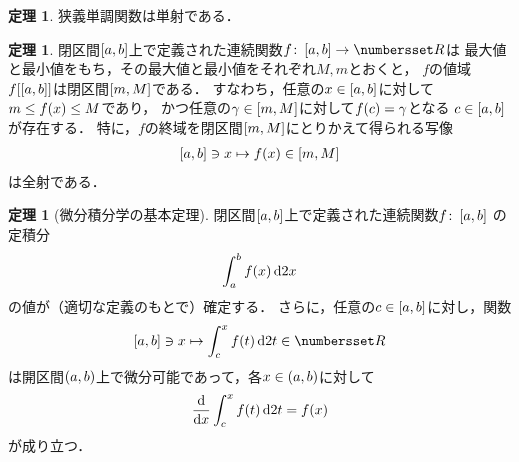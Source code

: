 \documentclass[11pt,a4paper]{ltjsarticle}
\newcommand*{\maparrow}{\rightarrow}
\newcommand*{\intd}{\dl2}
\newcommand*{\image}[2]{#1 \sqbracket*{#2}}
\theoremstyle{definition}
\newtheorem{thm}[dfn]{定理}
\begin{document}
\begin{thm} \label{thm:injection}
  狭義単調関数は単射である．
\end{thm}

\begin{thm} \label{thm:image}
  閉区間$\interval{c}{a,b}$上で定義された連続関数$f \colon \interval{c}{a,b} \maparrow \Real$は
  最大値と最小値をもち，その最大値と最小値をそれぞれ$M,m$とおくと，
  $f$の値域$\image{f}{\interval{c}{a,b}}$は閉区間$\interval{c}{m,M}$である．
  すなわち，任意の$x \in \interval{c}{a,b}$に対して$m \leq \apply{f}{x} \leq M$であり，
  かつ任意の$\gamma \in \interval{c}{m,M}$に対して$\apply{f}{c} = \gamma$となる
  $c \in \interval{c}{a,b}$が存在する．
  特に，$f$の終域を閉区間$\interval{c}{m,M}$にとりかえて得られる写像
  \begin{align}
    \interval{c}{a,b} \ni x \mapsto \apply{f}{x} \in \interval{c}{m,M}
    \label{eq:surjec}
  \end{align}
  は全射である．
\end{thm}

\begin{thm}[微分積分学の基本定理] \label{thm:int}
  閉区間$\interval{c}{a,b}$上で定義された連続関数$f \colon \interval{c}{a,b}$
  の定積分
  \begin{align}
    \int_a^b \apply{f}{x} \intd x
    \label{eq:int}
  \end{align}
  の値が（適切な定義のもとで）確定する．
  さらに，任意の$c \in \interval{c}{a,b}$に対し，関数
  \[
    \interval{c}{a,b} \ni x \mapsto \int_c^x \apply{f}{t} \intd t \in \Real
  \]
  は開区間$\interval{op}{a,b}$上で微分可能であって，各$x \in \interval{op}{a,b}$に対して
  \begin{align}
    \diff*{\int_c^x \apply{f}{t} \intd t}x = \apply{f}{x}
    \label{eq:intderi}
  \end{align}
  が成り立つ．
\end{thm}
\end{document}
